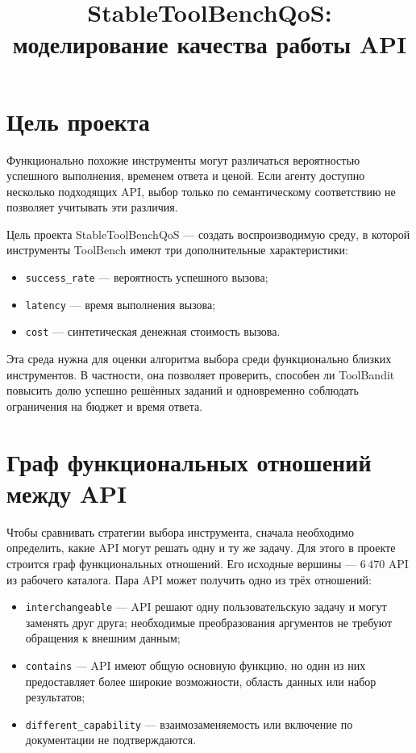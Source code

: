 \documentclass[12pt,a4paper]{article}
\title{StableToolBenchQoS: моделирование качества работы API}
\author{}
\date{}
\begin{document}
\maketitle

\section{Цель проекта}

Функционально похожие инструменты могут различаться вероятностью успешного
выполнения, временем ответа и ценой. Если агенту доступно несколько подходящих
API, выбор только по семантическому соответствию не позволяет учитывать эти
различия.

Цель проекта StableToolBenchQoS --- создать воспроизводимую среду, в которой
инструменты ToolBench имеют три дополнительные характеристики:
\begin{itemize}
    \item \texttt{success\_rate} --- вероятность успешного вызова;
    \item \texttt{latency} --- время выполнения вызова;
    \item \texttt{cost} --- синтетическая денежная стоимость вызова.
\end{itemize}

Эта среда нужна для оценки алгоритма выбора среди функционально близких
инструментов. В частности, она позволяет проверить, способен ли ToolBandit
повысить долю успешно решённых заданий и одновременно соблюдать ограничения
на бюджет и время ответа.

\section{Граф функциональных отношений между API}

Чтобы сравнивать стратегии выбора инструмента, сначала необходимо определить,
какие API могут решать одну и ту же задачу. Для этого в проекте строится граф
функциональных отношений. Его исходные вершины --- $6\,470$ API из рабочего
каталога. Пара API может получить одно из трёх отношений:
\begin{itemize}
    \item \texttt{interchangeable} --- API решают одну пользовательскую задачу
    и могут заменять друг друга; необходимые преобразования аргументов не
    требуют обращения к внешним данным;
    \item \texttt{contains} --- API имеют общую основную функцию, но один из
    них предоставляет более широкие возможности, область данных или набор
    результатов;
    \item \texttt{different\_capability} --- взаимозаменяемость или включение
    по документации не подтверждаются.
\end{itemize}
\end{document}
